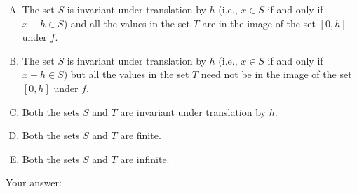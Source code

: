 \documentclass[10pt]{amsart}
\begin{document}
\begin{enumerate}
  \begin{enumerate}[(A)]
  \item The set $S$ is invariant under translation by $h$ (i.e., $x
    \in S$ if and only if $x + h \in S$) and all the values in the set
    $T$ are in the image of the set $[0,h]$ under $f$.
  \item The set $S$ is invariant under translation by $h$ (i.e., $x
    \in S$ if and only if $x + h \in S$) but all the values in the set
    $T$ need not be in the image of the set $[0,h]$ under $f$.
  \item Both the sets $S$ and $T$ are invariant under translation by $h$.
  \item Both the sets $S$ and $T$ are finite.
  \item Both the sets $S$ and $T$ are infinite.
  \end{enumerate}

  \vspace{0.1in}
  Your answer: $\underline{\qquad\qquad\qquad\qquad\qquad\qquad\qquad}$
  \vspace{1.5in}
\end{enumerate}
\end{document}
